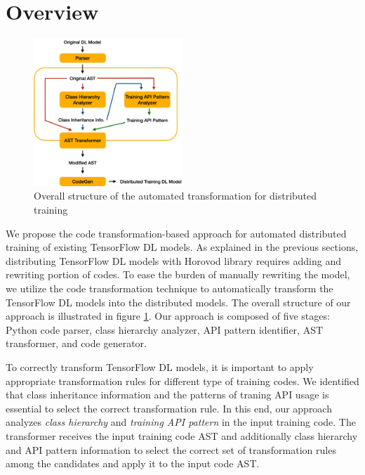 \section{Overview}

\begin{figure}[ht!]
  \centering
  \includegraphics[width=0.5\textwidth]{tool-arch.pdf}
  \caption{Overall structure of the 
  automated transformation for distributed training}
  \label{sysarch}
\end{figure}
 
We propose the code transformation-based approach 
for automated distributed training of existing TensorFlow DL models.
As explained in the previous sections, distributing TensorFlow DL models
with Horovod library requires adding and rewriting portion of codes. 
To ease the burden of manually rewriting the model,
we utilize the code transformation technique to automatically transform the
TensorFlow DL models into the distributed models.
The overall structure of our approach is illustrated in figure \ref{sysarch}.
Our approach is composed of five stages: Python code parser,
class hierarchy analyzer, API pattern identifier, AST transformer,
and code generator.
 
To correctly transform TensorFlow DL models,
it is important to apply appropriate transformation rules
for different type of training codes.
We identified that class inheritance information and
the patterns of traning API usage is essential to 
select the correct transformation rule. 
In this end, our approach analyzes \textit{class hierarchy}
and \textit{training API pattern} in the input training code.
The transformer receives the input training code AST and
additionally class hierarchy and API pattern information
to select the correct set of transformation rules among the candidates
and apply it to the input code AST.

